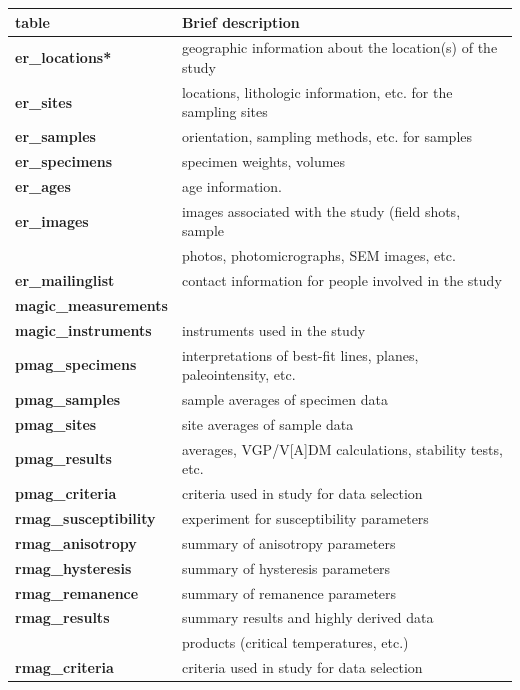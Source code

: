\documentclass[11pt]{book}
\begin{document}
{\begin{tabular}{ll}
\hline
table\qquad &Brief description\\
\hline
{\bf er\_locations*}\qquad & geographic information about the location(s) of the study\\
 {\bf er\_sites}\qquad & locations, lithologic information, etc. for the sampling sites\\
 {\bf er\_samples}\qquad & orientation, sampling methods, etc. for samples\\
  {\bf er\_specimens}\qquad &specimen weights, volumes\\
    {\bf er\_ages}\qquad &age information.\\
    {\bf er\_images}\qquad & images associated with the study (field shots, sample\\
    \qquad &photos, photomicrographs, SEM images, etc.\\
   {\bf er\_mailinglist}\qquad &contact information for people involved in the study\\
   \hline
   {\bf magic\_measurements} \qquad & \hskip 1em measurement data used in the study\\
    {\bf magic\_instruments}\qquad & instruments used in the study\\
       \hline
    {\bf pmag\_specimens}\qquad & interpretations of best-fit lines, planes, paleointensity, etc. \\
{\bf pmag\_samples}\qquad &sample averages of specimen data\\
{\bf pmag\_sites}\qquad & site averages of sample data\\
{\bf pmag\_results}\qquad & averages, VGP/V[A]DM calculations, stability tests, etc.\\
{\bf pmag\_criteria}\qquad &criteria used in study for data selection\\
   \hline
   {\bf rmag\_susceptibility}\qquad &experiment for susceptibility parameters\\
{\bf rmag\_anisotropy}\qquad & summary of anisotropy parameters\\
{\bf rmag\_hysteresis}\qquad & summary of hysteresis parameters\\
{\bf rmag\_remanence}\qquad &summary of remanence parameters\\
{\bf rmag\_results}\qquad &summary results and highly derived data \\
\qquad &products (critical temperatures, etc.)\\
{\bf rmag\_criteria}\qquad &criteria used in study for data selection\\
\hline
\end{tabular}



}
\end{document}
